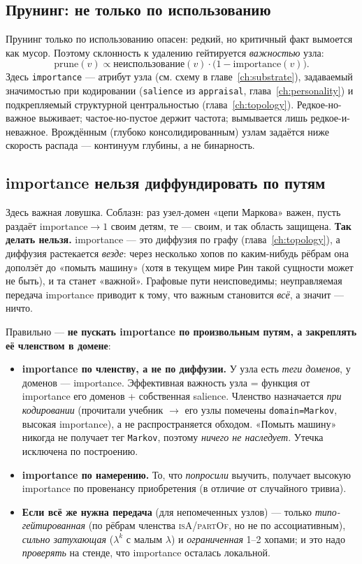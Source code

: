 \subsection{Прунинг: не только по использованию}

Прунинг только по использованию опасен: редкий, но критичный факт вымоется как
мусор. Поэтому склонность к удалению гейтируется \emph{важностью} узла:
\[
\mathrm{prune}(v) \propto \mathrm{неиспользование}(v)\cdot
\bigl(1 - \mathrm{importance}(v)\bigr).
\]
Здесь \texttt{importance} --- атрибут узла (см. схему в
главе~\ref{ch:substrate}), задаваемый значимостью при кодировании
(\texttt{salience} из \texttt{appraisal}, глава~\ref{ch:personality}) и
подкрепляемый структурной центральностью (глава~\ref{ch:topology}).
Редкое-но-важное выживает; частое-но-пустое держит частота; вымывается лишь
редкое-и-неважное. Врождённым (глубоко консолидированным) узлам задаётся
ниже скорость распада --- континуум глубины, а не бинарность.

\subsection{importance нельзя диффундировать по путям}
\label{sec:importance-leak}

Здесь важная ловушка. Соблазн: раз узел-домен «цепи Маркова» важен, пусть
раздаёт $\mathrm{importance} \to 1$ своим детям, те --- своим, и так область
защищена. \textbf{Так делать нельзя.} importance --- это диффузия по графу
(глава~\ref{ch:topology}), а диффузия растекается \emph{везде}: через
несколько хопов по каким-нибудь рёбрам она доползёт до «помыть машину»
(хотя в текущем мире Рин такой сущности может не быть), и та станет
«важной». Графовые пути неисповедимы; неуправляемая передача importance
приводит к тому, что важным становится \emph{всё}, а значит --- ничто.

Правильно --- \textbf{не пускать importance по произвольным путям, а
закреплять её членством в домене}:
\begin{itemize}
\item \textbf{importance по членству, а не по диффузии.} У узла есть
\emph{теги доменов}, у доменов --- importance. Эффективная важность узла =
функция от importance его доменов + собственная salience. Членство
назначается \emph{при кодировании} (прочитали учебник $\to$ его узлы помечены
\texttt{domain=Markov}, высокая importance), а не распространяется обходом.
«Помыть машину» никогда не получает тег \texttt{Markov}, поэтому
\emph{ничего не наследует}. Утечка исключена по построению.
\item \textbf{importance по намерению.} То, что \emph{попросили} выучить,
получает высокую importance по провенансу приобретения (в отличие от
случайного тривиа).
\item \textbf{Если всё же нужна передача} (для непомеченных узлов) --- только
\emph{типо-гейтированная} (по рёбрам членства \textsc{isA}/\textsc{partOf},
но не по ассоциативным), \emph{сильно затухающая} ($\lambda^k$ с малым
$\lambda$) и \emph{ограниченная} 1--2 хопами; и это надо \emph{проверять} на
стенде, что importance осталась локальной.
\end{itemize}

